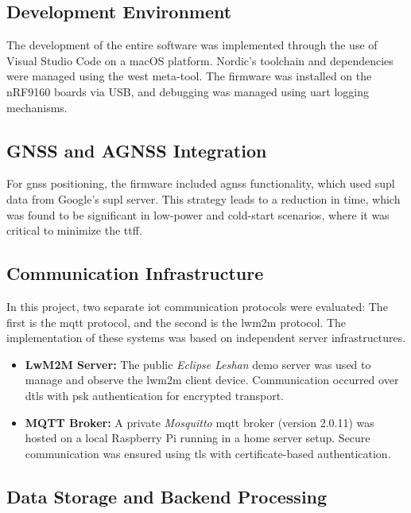 \documentclass[12pt, english, openany]{book}
\begin{document}
\subsection{Development Environment}

The development of the entire software was implemented through the use of Visual Studio Code on a macOS platform. Nordic's toolchain and dependencies were managed using the west meta-tool. The firmware was installed on the nRF9160 boards via USB, and debugging was managed using \gls{uart} logging mechanisms.

\subsection{GNSS and AGNSS Integration}

For \gls{gnss} positioning, the firmware included \gls{agnss} functionality, which used \gls{supl} data from Google's \gls{supl} server. This strategy leads to a reduction in time, which was found to be significant in low-power and cold-start scenarios, where it was critical to minimize the \gls{ttff}.

\subsection{Communication Infrastructure}

In this project, two separate \gls{iot} communication protocols were evaluated: The first is the \gls{mqtt} protocol, and the second is the \gls{lwm2m} protocol. The implementation of these systems was based on independent server infrastructures.

\begin{itemize}
    \item \textbf{LwM2M Server:} The public \textit{Eclipse Leshan} demo server was used to manage and observe the \gls{lwm2m} client device. Communication occurred over \gls{dtls} with \gls{psk} authentication for encrypted transport.
    \item \textbf{MQTT Broker:} A private \textit{Mosquitto} \gls{mqtt} broker (version 2.0.11) was hosted on a local Raspberry Pi running in a home server setup. Secure communication was ensured using \gls{tls} with certificate-based authentication.
\end{itemize}

\subsection{Data Storage and Backend Processing}
\end{document}
